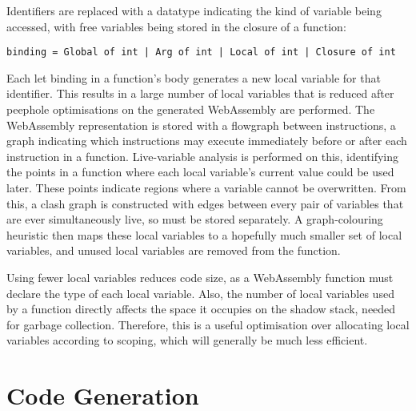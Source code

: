 Identifiers are replaced with a datatype indicating the kind of variable being accessed, with free variables being stored in the closure of a function:

\verb"binding = Global of int | Arg of int | Local of int | Closure of int"

Each let binding in a function's body generates a new local variable for that identifier. This results in a large number of local variables that is reduced after peephole optimisations on the generated WebAssembly are performed. 
The WebAssembly representation is stored with a flowgraph between instructions, a graph indicating which instructions may execute immediately before or after each instruction in a function. 
Live-variable analysis is performed on this, identifying the points in a function where each local variable's current value could be used later. These points indicate regions where a variable cannot be overwritten. From this, a clash graph is constructed with edges between every pair of variables that are ever simultaneously live, so must be stored separately. A graph-colouring heuristic then maps these local variables to a hopefully much smaller set of local variables, and unused local variables are removed from the function.

Using fewer local variables reduces code size, as a WebAssembly function must declare the type of each local variable.
Also, the number of local variables used by a function directly affects the space it occupies on the shadow stack, needed for garbage collection. Therefore, this is a useful optimisation over allocating local variables according to scoping, which will generally be much less efficient.


\section{Code Generation}

